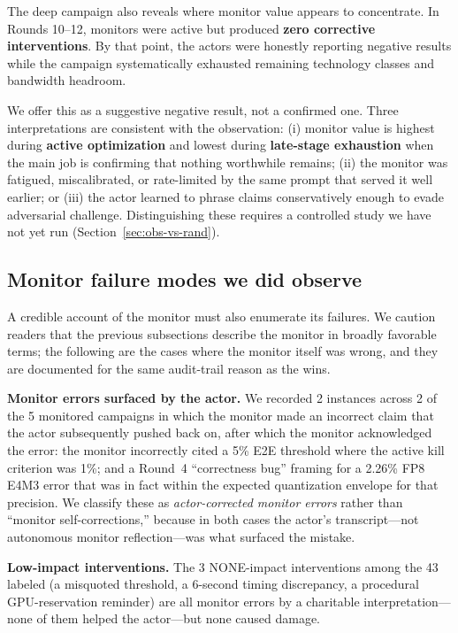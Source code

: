 \documentclass[11pt]{article}
\begin{document}
The deep campaign also reveals where monitor value appears to concentrate. In Rounds 10--12, monitors were active but produced \textbf{zero corrective interventions}. By that point, the actors were honestly reporting negative results while the campaign systematically exhausted remaining technology classes and bandwidth headroom.

We offer this as a suggestive negative result, not a confirmed one. Three interpretations are consistent with the observation: (i) monitor value is highest during \textbf{active optimization} and lowest during \textbf{late-stage exhaustion} when the main job is confirming that nothing worthwhile remains; (ii) the monitor was fatigued, miscalibrated, or rate-limited by the same prompt that served it well earlier; or (iii) the actor learned to phrase claims conservatively enough to evade adversarial challenge. Distinguishing these requires a controlled study we have not yet run (Section~\ref{sec:obs-vs-rand}).

\subsection{Monitor failure modes we did observe}
\label{sec:monitor-failures}

A credible account of the monitor must also enumerate its failures. We caution readers that the previous subsections describe the monitor in broadly favorable terms; the following are the cases where the monitor itself was wrong, and they are documented for the same audit-trail reason as the wins.

\textbf{Monitor errors surfaced by the actor.} We recorded 2 instances across 2 of the 5 monitored campaigns in which the monitor made an incorrect claim that the actor subsequently pushed back on, after which the monitor acknowledged the error: the monitor incorrectly cited a 5\% E2E threshold where the active kill criterion was 1\%; and a Round~4 ``correctness bug'' framing for a 2.26\% FP8 E4M3 error that was in fact within the expected quantization envelope for that precision. We classify these as \emph{actor-corrected monitor errors} rather than ``monitor self-corrections,'' because in both cases the actor's transcript---not autonomous monitor reflection---was what surfaced the mistake.

\textbf{Low-impact interventions.} The 3 NONE-impact interventions among the 43 labeled (a misquoted threshold, a 6-second timing discrepancy, a procedural GPU-reservation reminder) are all monitor errors by a charitable interpretation---none of them helped the actor---but none caused damage.
\end{document}

